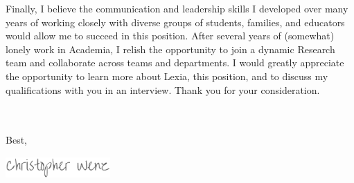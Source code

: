 \documentclass[10pt, a4paper]{awesome-cv}
\begin{document}
\begin{cvletter}
Finally, I believe the communication and leadership skills I developed over many years of working closely with diverse groups of students, families, and educators would allow me to succeed in this position. After several years of (somewhat) lonely work in Academia, I relish the opportunity to join a dynamic Research team and collaborate across teams and departments.  I would greatly appreciate the opportunity to learn more about Lexia, this position, and to discuss my qualifications with you in an interview. Thank you for your consideration.  

\\\\
Best,
\end{cvletter}

\includegraphics[width=4cm, height=0.8cm]{./img/sig.png}
\end{document}
